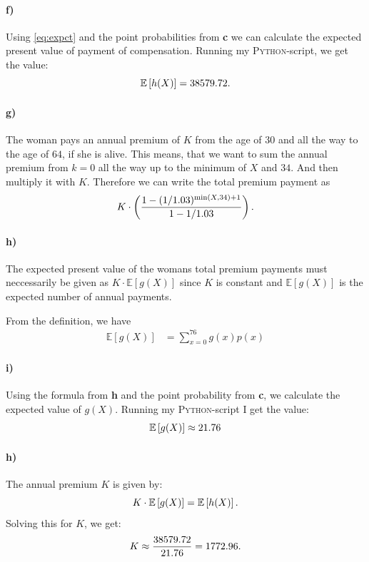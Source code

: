 \documentclass[a4paper]{article}
\theoremstyle{definition}
\begin{document}
\paragraph{f)}
Using \eqref{eq:expct} and the point probabilities from \textbf{c} we can calculate
the expected present value of payment of compensation.
Running my \textsc{Python}-script, we get the value:
\begin{equation}
  \notag
  \mathbb{E}\left[ h(X) \right] = 38579.72.
\end{equation}

\paragraph{g)}
The woman pays an annual premium of $K$ from the age of $30$ and all the way to
the age of $64$, if she is alive. This means, that we want to sum the annual
premium from $k = 0$ all the way up to the minimum of $X$ and $34$. And then
multiply it with $K$.  Therefore we can write the total premium payment as
\begin{equation}
  \notag
  K \cdot \left( \frac{1 - (1/1.03)^{\min\left( X, 34 \right)+1}}{1 - 1/1.03} \right).
\end{equation}

\paragraph{h)}
The expected present value of the womans total premium payments must
neccessarily be given as $K \cdot \mathbb{E}\left[ g(X) \right]$ since $K$ is
constant and $\mathbb{E}\left[ g(X) \right]$ is the expected number of annual
payments.

From the definition, we have
\begin{align*}
  \label{eq:}
  \mathbb{E}\left[ g(X) \right] &= \sum_{x=0}^{76}g(x)p(x)
\end{align*}

\paragraph{i)}
Using the formula from \textbf{h} and the point probability from \textbf{c}, we
calculate the expected value of $g(X)$.  Running my \textsc{Python}-script I
get the value:
\begin{equation}
  \notag
  \mathbb{E}\left[ g(X) \right] \approx 21.76
\end{equation}
\paragraph{h)}

The annual premium $K$ is given by:
\begin{equation}
  \notag
  K \cdot \mathbb{E}\left[ g(X) \right] = \mathbb{E}\left[ h(X) \right].
\end{equation}
Solving this for $K$, we get:
\begin{equation}
  \notag
  K \approx \frac{38579.72}{21.76} = 1772.96.
\end{equation}
\end{document}

